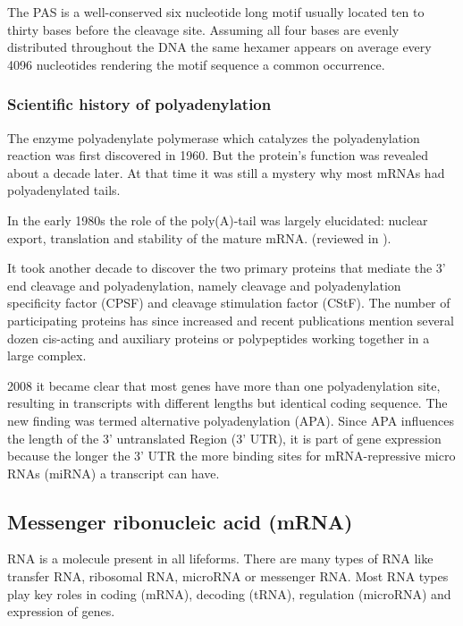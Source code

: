 
The PAS is a well-conserved six nucleotide long motif usually located ten to thirty bases before the cleavage site.  Assuming all four bases are evenly distributed throughout the DNA the same hexamer appears on average every 4096 nucleotides rendering the motif sequence a common occurrence. 



\subsubsection{Scientific history of polyadenylation}
The enzyme polyadenylate polymerase which catalyzes the polyadenylation reaction was first discovered in 1960. \cite{pmid13819354} But the protein's function was revealed about a decade later. \cite{pmid5288383} At that time it was still a mystery why most mRNAs had polyadenylated tails. 

In the early 1980s the role of the poly(A)-tail was largely elucidated: nuclear export, translation and stability of the mature mRNA. (reviewed in \cite{pmid6111419}). 

It took another decade to discover the two primary proteins that mediate the 3' end cleavage and polyadenylation, namely cleavage and polyadenylation specificity factor (CPSF) and cleavage stimulation factor (CStF). The number of participating proteins has since increased and recent publications mention several dozen cis-acting and auxiliary proteins or polypeptides working together in a large complex. \cite{pmid23774734} 

2008 it became clear that most genes have more than one polyadenylation site, resulting in transcripts with different lengths but identical coding sequence. \cite{pmid18411206} The new finding was termed alternative polyadenylation (APA). Since APA influences the length of the 3' untranslated Region (3' UTR), it is part of gene expression because the longer the 3' UTR the more binding sites for mRNA-repressive micro RNAs (miRNA) a transcript can have. \cite{pmid18566288}


\subsection{Messenger ribonucleic acid (mRNA)}
RNA is a molecule present in all lifeforms. There are many types of RNA like transfer RNA, ribosomal RNA, microRNA or messenger RNA. Most RNA types play key roles in coding (mRNA), decoding (tRNA), regulation (microRNA) and expression of genes.

